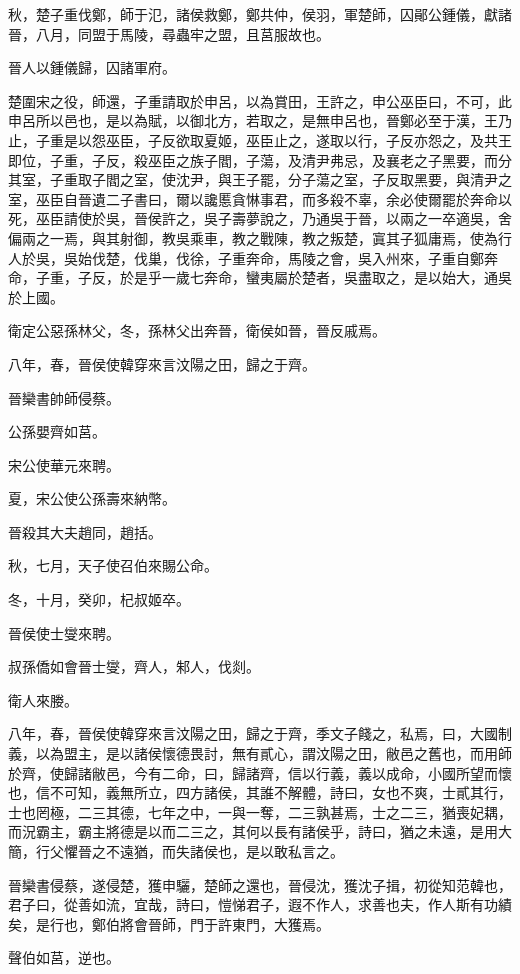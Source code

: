 \begin{pinyinscope}
秋，楚子重伐鄭，師于氾，諸侯救鄭，鄭共仲，侯羽，軍楚師，囚鄖公鍾儀，獻諸晉，八月，同盟于馬陵，尋蟲牢之盟，且莒服故也。

晉人以鍾儀歸，囚諸軍府。

楚圍宋之役，師還，子重請取於申呂，以為賞田，王許之，申公巫臣曰，不可，此申呂所以邑也，是以為賦，以御北方，若取之，是無申呂也，晉鄭必至于漢，王乃止，子重是以怨巫臣，子反欲取夏姬，巫臣止之，遂取以行，子反亦怨之，及共王即位，子重，子反，殺巫臣之族子閻，子蕩，及清尹弗忌，及襄老之子黑要，而分其室，子重取子閻之室，使沈尹，與王子罷，分子蕩之室，子反取黑要，與清尹之室，巫臣自晉遺二子書曰，爾以讒慝貪惏事君，而多殺不辜，余必使爾罷於奔命以死，巫臣請使於吳，晉侯許之，吳子壽夢說之，乃通吳于晉，以兩之一卒適吳，舍偏兩之一焉，與其射御，教吳乘車，教之戰陳，教之叛楚，寘其子狐庸焉，使為行人於吳，吳始伐楚，伐巢，伐徐，子重奔命，馬陵之會，吳入州來，子重自鄭奔命，子重，子反，於是乎一歲七奔命，蠻夷屬於楚者，吳盡取之，是以始大，通吳於上國。

衛定公惡孫林父，冬，孫林父出奔晉，衛侯如晉，晉反戚焉。

八年，春，晉侯使韓穿來言汶陽之田，歸之于齊。

晉欒書帥師侵蔡。

公孫嬰齊如莒。

宋公使華元來聘。

夏，宋公使公孫壽來納幣。

晉殺其大夫趙同，趙括。

秋，七月，天子使召伯來賜公命。

冬，十月，癸卯，杞叔姬卒。

晉侯使士燮來聘。

叔孫僑如會晉士燮，齊人，邾人，伐剡。

衛人來媵。

八年，春，晉侯使韓穿來言汶陽之田，歸之于齊，季文子餞之，私焉，曰，大國制義，以為盟主，是以諸侯懷德畏討，無有貳心，謂汶陽之田，敝邑之舊也，而用師於齊，使歸諸敝邑，今有二命，曰，歸諸齊，信以行義，義以成命，小國所望而懷也，信不可知，義無所立，四方諸侯，其誰不解體，詩曰，女也不爽，士貳其行，士也罔極，二三其德，七年之中，一與一奪，二三孰甚焉，士之二三，猶喪妃耦，而況霸主，霸主將德是以而二三之，其何以長有諸侯乎，詩曰，猶之未遠，是用大簡，行父懼晉之不遠猶，而失諸侯也，是以敢私言之。

晉欒書侵蔡，遂侵楚，獲申驪，楚師之還也，晉侵沈，獲沈子揖，初從知范韓也，君子曰，從善如流，宜哉，詩曰，愷悌君子，遐不作人，求善也夫，作人斯有功績矣，是行也，鄭伯將會晉師，門于許東門，大獲焉。

聲伯如莒，逆也。


\end{pinyinscope}
